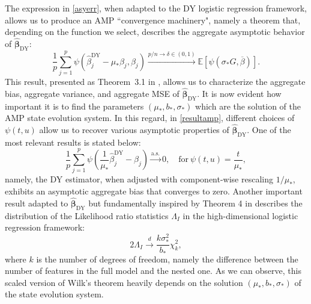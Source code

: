 \documentclass{article}
\begin{document}
The expression in \eqref{asyerr}, when adapted to the DY logistic regression framework, allows us to produce an AMP ``convergence machinery", namely a theorem that, depending on the function we select, describes the aggregate asymptotic behavior of $\hat{\boldsymbol{\beta}}_{\text{DY}}$:
\begin{equation}
\frac{1}{p}\overset{p}{\underset{j=1}\sum}\psi(\hat{\beta}_j^{\text{DY}}-\mu_{*}\beta_j,\beta_j)\overset{p/n\rightarrow\delta\in(0,1)}{\longrightarrow}\mathbb{E}[\psi(\sigma_*G,\overline{\beta})].
\label{resultamp}
\end{equation}
This result, presented as Theorem~3.1 in \citep{DYkosmidis}, allows us to characterize the aggregate bias, aggregate variance, and aggregate MSE of $\hat{\boldsymbol{\beta}}_{\text{DY}}$. It is now evident how important it is to find the parameters $(\mu_*,b_*,\sigma_*)$ which are the solution of the AMP state evolution system. In this regard, in \eqref{resultamp}, different choices of $\psi(t,u)$ allow us to recover various asymptotic properties of $\hat{\boldsymbol{\beta}}_{\text{DY}}$. One of the most relevant results is stated below:
\begin{equation}
\frac{1}{p}\overset{p}{\underset{j=1}\sum}\psi\left(\frac{1}{\mu_{*}}\hat{\beta}_j^{\text{DY}}-\beta_j\right)\overset{\text{a.s.}}{\longrightarrow}0,\quad \text{for}\ \psi(t,u)=\frac{t}{\mu_{*}},
\end{equation}
namely, the DY estimator, when adjusted with component-wise rescaling $1/\mu_{*}$, exhibits an asymptotic aggregate bias that converges to zero. Another important result adapted to  $\hat{\boldsymbol{\beta}}_{\text{DY}}$ but fundamentally inspired by Theorem 4 in \citep{candessur} describes the distribution of the Likelihood ratio statistics $\Lambda_{I}$ in the high-dimensional logistic regression framework:
\begin{equation}
2\Lambda_{I}\overset{d}{\longrightarrow}\frac{k\sigma^2_{*}}{b_{*}}\chi_k^2,
\end{equation}
where $k$ is the number of degrees of freedom, namely the difference between the number of features in the full model and the nested one. As we can observe, this scaled version of Wilk's theorem heavily depends on the solution $(\mu_{*},b_{*},\sigma_{*})$ of the state evolution system.
\end{document}

